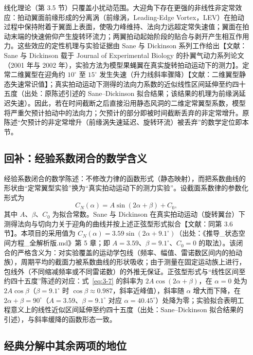 \documentclass[11pt,a4paper]{ctexart}
\numberwithin{equation}{section}
\begin{document}
线化理论（第 3.5 节）只覆盖小扰动范围。大迎角下存在更强的非线性非定常效应：拍动翼面前缘形成的分离涡（前缘涡，Leading-Edge Vortex，LEV）在拍动过程中保持附着于翼面上表面，使吸力峰维持、法向力远超定常失速值；翼面在拍动末端的快速俯仰产生旋转环流力；两翼拍动起始阶段的贴合与剥开产生相互作用力。这些效应的定性机理与实验证据由 Sane 与 Dickinson 系列工作给出【文献：Sane 与 Dickinson 载于 Journal of Experimental Biology 的扑翼气动力系列论文（2001 年与 2002 年），实验方法为模型果蝇翼在真实旋转拍动运动下的测力】。定常二维翼型在迎角约 $10^\circ$ 至 $15^\circ$ 发生失速（升力线斜率骤降）【文献：二维翼型静态失速常识值】；真实拍动运动下测得的法向力系数的近似线性区间延伸至约四十五度（出处：原陈述引述的 Sane--Dickinson 拟合结果；该结果的机理为前缘涡延迟失速）。因此，若在时间截断之后直接沿用静态风洞的二维定常翼型系数，模型将严重欠预计拍动中的法向力；欠预计的部分即被时间截断丢弃的非定常增升。原陈述“欠预计的非定常增升（前缘涡失速延迟、旋转环流）被丢弃”的数学定位即本节。

\subsection{回补：经验系数闭合的数学含义}

经验系数闭合的数学陈述：不修改力律的函数形式（静态映射），而把系数曲线的形状由“定常翼型实验”换为“真实拍动运动下的测力实验”。设截面系数律的参数化形式为
\begin{equation}
  C_N(\alpha) = A\sin(2\alpha + \beta) + C_0, \label{eq:3-7}
\end{equation}
其中 $A$、$\beta$、$C_0$ 为拟合常数。Sane 与 Dickinson 在真实拍动运动（旋转翼台）下测得法向与切向力关于迎角的曲线并按上述正弦型形式拟合【文献：同第 3.6 节】。本项目的采用值为 $C_N(\alpha) = 3.59\sin(2\alpha + 9.1^\circ)$（出处：《推导\_状态空间方程\_全解析版.md》第 5 章；即 $A = 3.59$、$\beta = 9.1^\circ$、$C_0 = 0$ 的取法）。该闭合的严格含义为：对实验覆盖的运动学包线（频率、幅值、雷诺数区间内的拍动族），周期平均的截面力被系数曲线的形状吸收；由于测量在固定运动族上进行，包线外（不同缩减频率或不同雷诺数）的外推无保证。正弦型形式与“线性区间至约四十五度”陈述的对应：式~\eqref{eq:3-7} 的斜率为 $2A\cos(2\alpha + \beta)$，在 $\alpha = 0$ 处为 $2A\cos\beta$（$\beta = 9.1^\circ$ 时 $\cos\beta \approx 0.987$，斜率近峰值），斜率随 $\alpha$ 增大而下降，在 $2\alpha + \beta = 90^\circ$（$A = 3.59$、$\beta = 9.1^\circ$ 对应 $\alpha = 40.45^\circ$）处降为零；实验拟合表明工程意义上的线性近似区间延伸至约四十五度（出处：Sane--Dickinson 拟合结果的引述），与斜率缓降的函数形态一致。

\subsection{经典分解中其余两项的地位}
\end{document}
